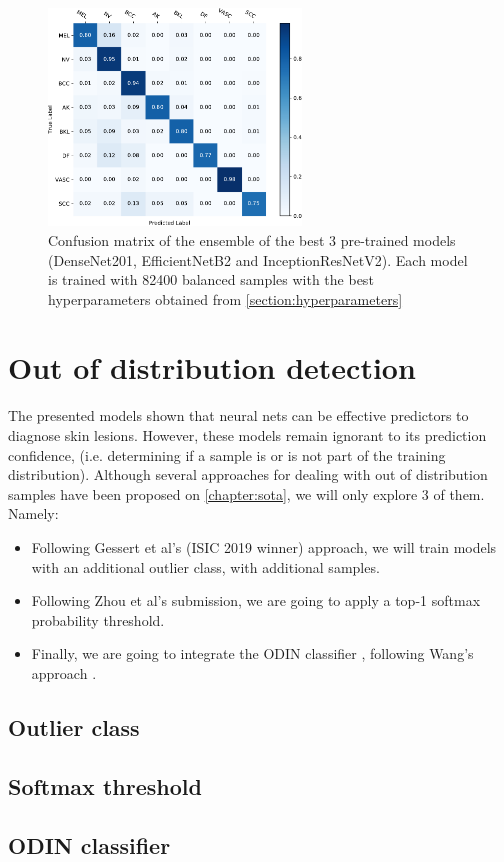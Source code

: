     \begin{figure}[ht]
        \centering
        \includegraphics[width=0.6\textwidth]{figs/densenet201_best_ensembe_3.pdf}
        \caption{Confusion matrix of the ensemble of the best 3 pre-trained models (DenseNet201, EfficientNetB2 and InceptionResNetV2). Each model is trained with 82400 balanced samples with the best hyperparameters obtained from \autoref{section:hyperparameters}}
        \label{fig:densenet201_best_ensembe_3}
    \end{figure}



\section{Out of distribution detection} \label{section:outdist}
    The presented models shown that neural nets can be effective predictors to diagnose skin lesions. However, these models remain ignorant to its prediction confidence, (i.e. determining if a sample is or is not part of the training distribution). Although several approaches for dealing with out of distribution samples have been proposed on \autoref{chapter:sota}, we will only explore 3 of them. Namely:
    
    \begin{itemize}
        \item Following Gessert et al's (ISIC 2019 winner) approach, we will train models with an additional outlier class, with additional samples.
        \item Following Zhou et al's submission, we are going to apply a top-1 softmax probability threshold.
        \item Finally, we are going to integrate the ODIN classifier \cite{odin}, following Wang's approach \cite{Wang}.
    \end{itemize}
    
    \subsection{Outlier class}
    
    \subsection{Softmax threshold}
    
    \subsection{ODIN classifier}